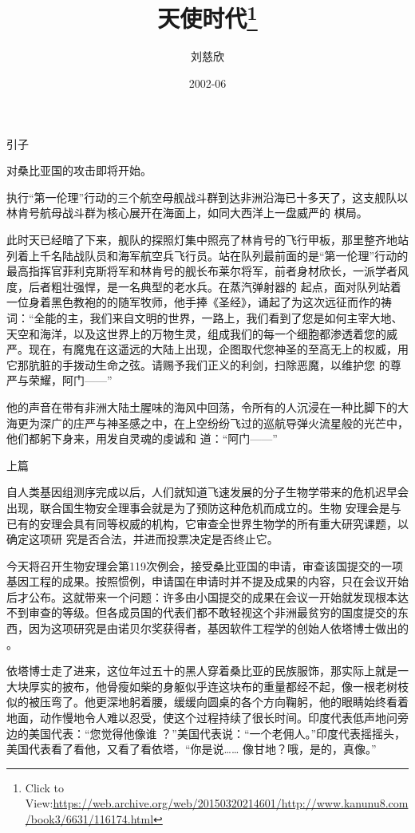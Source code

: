\documentclass{article}
\title{天使时代\footnote{Click to View:\url{https://web.archive.org/web/20150320214601/http://www.kanunu8.com/book3/6631/116174.html}}}
\author{刘慈欣}
\date{2002-06}
\begin{document}

\maketitle


\Large


﻿引子 


对桑比亚国的攻击即将开始。 

执行“第一伦理”行动的三个航空母舰战斗群到达非洲沿海已十多天了，这支舰队以林肯号航母战斗群为核心展开在海面上，如同大西洋上一盘威严的
棋局。 

此时天已经暗了下来，舰队的探照灯集中照亮了林肯号的飞行甲板，那里整齐地站列着上千名陆战队员和海军航空兵飞行员。站在队列最前面的是“第一伦理”行动的最高指挥官菲利克斯将军和林肯号的舰长布莱尔将军，前者身材欣长，一派学者风度，后者粗壮强悍，是一名典型的老水兵。在蒸汽弹射器的
\newpage
起点，面对队列站着一位身着黑色教袍的的随军牧师，他手捧《圣经》，诵起了为这次远征而作的祷词：“全能的主，我们来自文明的世界，一路上，我们看到了您是如何主宰大地、天空和海洋，以及这世界上的万物生灵，组成我们的每一个细胞都渗透着您的威严。现在，有魔鬼在这遥远的大陆上出现，企图取代您神圣的至高无上的权威，用它那肮脏的手拨动生命之弦。请赐予我们正义的利剑，扫除恶魔，以维护您
的尊严与荣耀，阿门——” 

他的声音在带有非洲大陆土腥味的海风中回荡，令所有的人沉浸在一种比脚下的大海更为深广的庄严与神圣感之中，在上空纷纷飞过的巡航导弹火流星般的光芒中，他们都躬下身来，用发自灵魂的虔诚和
道：“阿门——” 


上篇 

自人类基因组测序完成以后，人们就知道飞速发展的分子生物学带来的危机迟早会出现，联合国生物安全理事会就是为了预防这种危机而成立的。生物
\newpage
安理会是与已有的安理会具有同等权威的机构，它审查全世界生物学的所有重大研究课题，以确定这项研
究是否合法，并进而投票决定是否终止它。 

今天将召开生物安理会第119次例会，接受桑比亚国的申请，审查该国提交的一项基因工程的成果。按照惯例，申请国在申请时并不提及成果的内容，只在会议开始后才公布。这就带来一个问题：许多由小国提交的成果在会议一开始就发现根本达不到审查的等级。但各成员国的代表们都不敢轻视这个非洲最贫穷的国度提交的东西，因为这项研究是由诺贝尔奖获得者，基因软件工程学的创始人依塔博士做出的
。 

依塔博士走了进来，这位年过五十的黑人穿着桑比亚的民族服饰，那实际上就是一大块厚实的披布，他骨瘦如柴的身躯似乎连这块布的重量都经不起，像一根老树枝似的被压弯了。他更深地躬着腰，缓缓向圆桌的各个方向鞠躬，他的眼睛始终看着地面，动作慢地令人难以忍受，使这个过程持续了很长时间。印度代表低声地问旁边的美国代表：“您觉得他像谁
\newpage
？”美国代表说：“一个老佣人。”印度代表摇摇头，美国代表看了看他，又看了看依塔，“你是说……
像甘地？哦，是的，真像。” 
\end{document}

